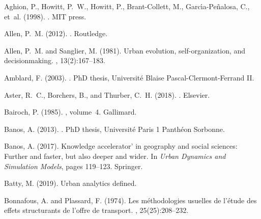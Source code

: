 \documentclass[10pt]{article}
\begin{document}
%
%

\begin{thebibliography}{}

Aghion, P., Howitt, P.~W., Howitt, P., Brant-Collett, M.,
  Garc{\'\i}a-Pe{\~n}alosa, C., et~al. (1998).
.
\newblock MIT press.

Allen, P.~M. (2012).
.
\newblock Routledge.

Allen, P.~M. and Sanglier, M. (1981).
\newblock Urban evolution, self-organization, and decisionmaking.
, 13(2):167--183.

Amblard, F. (2003).
.
\newblock PhD thesis, Universit{\'e} Blaise Pascal-Clermont-Ferrand II.

Aster, R.~C., Borchers, B., and Thurber, C.~H. (2018).
.
\newblock Elsevier.

Bairoch, P. (1985).
, volume~4.
\newblock Gallimard.

Banos, A. (2013).
.
\newblock PhD thesis, Universit{\'e} Paris 1 Panth{\'e}on Sorbonne.

Banos, A. (2017).
\newblock Knowledge accelerator' in geography and social sciences: Further and
  faster, but also deeper and wider.
\newblock In {\em Urban Dynamics and Simulation Models}, pages 119--123.
  Springer.

Batty, M. (2019).
\newblock Urban analytics defined.

Bonnafous, A. and Plassard, F. (1974).
\newblock Les m{\'e}thodologies usuelles de l'{\'e}tude des effets structurants
  de l'offre de transport.
, 25(25):208--232.


\end{thebibliography}
\end{document}
